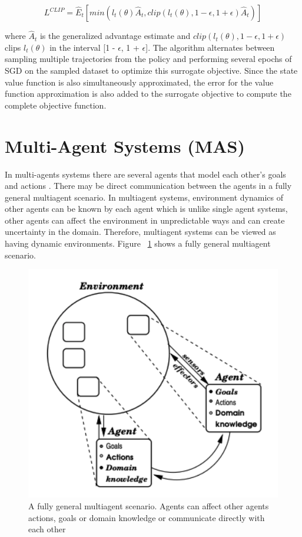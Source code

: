 \documentclass[12pt]{report}
\begin{document}
\[ L^{CLIP} = \hat{E}_t [min(l_t(\theta) \hat{A}_t, clip(l_t (\theta) , 1- \epsilon , 1+\epsilon)\hat{A}_t)] \]

\hfill \break
where $\hat{A}_t$ is the generalized advantage estimate and $clip(l_t (\theta) , 1- \epsilon , 1+\epsilon)$ clips $l_t(\theta)$ in the interval [1 - $\epsilon$, 1 + $\epsilon$]. The algorithm alternates between sampling multiple trajectories from the policy and performing several epochs of SGD on the
sampled dataset to optimize this surrogate objective. Since the state value function is also simultaneously approximated, the error for the value function approximation is also added to the surrogate
objective to compute the complete objective function. 

\section{Multi-Agent Systems (MAS)}

In multi-agents systems there are several agents that model each other's goals and actions \cite{Stone}. There may be direct communication between the agents in a fully general multiagent scenario. In multiagent systems, environment dynamics of other agents can be known by each agent which is unlike single agent systems, other agents can affect the environment in unpredictable ways and can create uncertainty in the domain. Therefore, multiagent systems can be viewed as having dynamic environments. Figure ~\ref{fig:MultiAgentSystem} shows a fully general multiagent scenario. 

\begin{figure}[!h]
    \centering
    \includegraphics[width=12cm]{MultiAgentSystem.png}
    \caption{A fully general multiagent scenario. Agents can affect other agents actions, goals or domain knowledge or communicate directly with each other \cite{Stone}}
    \label{fig:MultiAgentSystem}
\end{figure}
\end{document}
